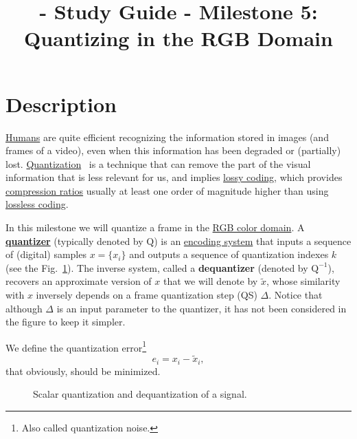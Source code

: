 
\title{\SM{} - Study Guide - Milestone 5: Quantizing in the RGB Domain}

\maketitle

\tableofcontents

\section{Description}
\href{https://en.wikipedia.org/wiki/Visual_system}{Humans} are quite
efficient recognizing the information stored in images (and frames of
a video), even when this information has been degraded or (partially)
lost. \href{https://en.wikipedia.org/wiki/Quantization_(signal_processing)}{Quantization}~\cite{sayood2017introduction,vetterli2014foundations}
is a technique that can remove the part of the visual information that
is less relevant for us, and implies
\href{https://en.wikipedia.org/wiki/Lossy_compression}{lossy coding},
which provides
\href{https://en.wikipedia.org/wiki/Data_compression_ratio}{compression
  ratios} usually at least one order of magnitude higher than using
\href{https://en.wikipedia.org/wiki/Lossless_compression}{lossless
  coding}.

In this milestone we will quantize a frame in the
\href{https://en.wikipedia.org/wiki/RGB_color_model}{RGB color
  domain}. A
\href{https://en.wikipedia.org/wiki/Quantization_(signal_processing)}{\textbf{quantizer}}
(typically denoted by $\text{Q}$) is an
\href{https://en.wikipedia.org/wiki/Data_compression}{encoding system}
that inputs a sequence of (digital) samples $x=\{x_i\}$ and outputs a
sequence of quantization indexes $k$ (see the Fig.~\ref{fig:Q}). The
inverse system, called a \textbf{dequantizer} (denoted by
$\text{Q}^{-1}$), recovers an approximate version of $x$ that we will denote
by $\tilde{x}$, whose similarity with $x$ inversely depends on a frame
quantization step (QS) $\Delta$. Notice that although $\Delta$ is an
input parameter to the quantizer, it has not been considered in the
figure to keep it simpler.

We define the quantization error\footnote{Also called quantization
noise.}
\begin{equation}
  e_i = x_i - \tilde{x}_i,
\end{equation}
that obviously, should be minimized.

\begin{figure}
  \centering
  \caption{Scalar quantization and dequantization of a signal.}
  \label{fig:Q}
\end{figure}

